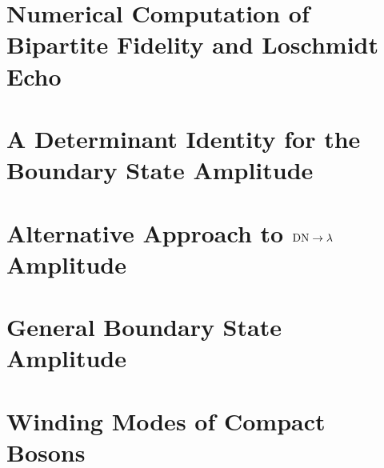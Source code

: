 \documentclass[reprint, prb]{revtex4-1}
\begin{document}
\section{Numerical Computation of Bipartite Fidelity and Loschmidt Echo}
\label{app:comp_fid_echo}


\section{A Determinant Identity for the Boundary State Amplitude}
\label{app:pf_of_id}


\section{Alternative Approach to ${\rm DN} \rightarrow \lambda$ Amplitude}
\label{app:gnd_dn_lambda}


\section{General Boundary State Amplitude}
\label{app:lambda_12}


\section{Winding Modes of Compact Bosons}
\label{app:compact_diff_boson}




\end{document}
